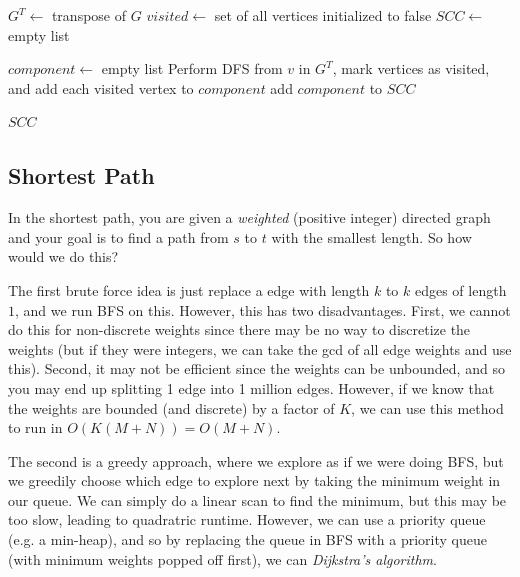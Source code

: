 \begin{algo}
\begin{algorithm}[H]
\begin{algorithmic}[1]
        \State $G^T \gets $ transpose of $G$ 
        \State $visited \gets $ set of all vertices initialized to false 
        \State $SCC \gets $ empty list 
        
         
           
            \State $component \gets $ empty list 
            \State Perform DFS from $v$ in $G^T$, mark vertices as visited, and add each visited vertex to $component$ 
            \State add $component$ to $SCC$ 
          \EndIf
        \EndFor
        
        \State \Return $SCC$ 
      \EndProcedure
    \end{algorithmic}
    \end{algorithm}
  \end{algo}

\subsection{Shortest Path}

  In the shortest path, you are given a \textit{weighted} (positive integer) directed graph and your goal is to find a path from $s$ to $t$ with the smallest length. So how would we do this? 

  The first brute force idea is just replace a edge with length $k$ to $k$ edges of length $1$, and we run BFS on this. However, this has two disadvantages. First, we cannot do this for non-discrete weights since there may be no way to discretize the weights (but if they were integers, we can take the gcd of all edge weights and use this). Second, it may not be efficient since the weights can be unbounded, and so you may end up splitting 1 edge into 1 million edges. However, if we know that the weights are bounded (and discrete) by a factor of $K$, we can use this method to run in $O(K (M + N)) = O(M + N)$. 

  The second is a greedy approach, where we explore as if we were doing BFS, but we greedily choose which edge to explore next by taking the minimum weight in our queue. We can simply do a linear scan to find the minimum, but this may be too slow, leading to quadratric runtime. However, we can use a priority queue (e.g. a min-heap), and so by replacing the queue in BFS with a priority queue (with minimum weights popped off first), we can \textit{Dijkstra's algorithm}. 

